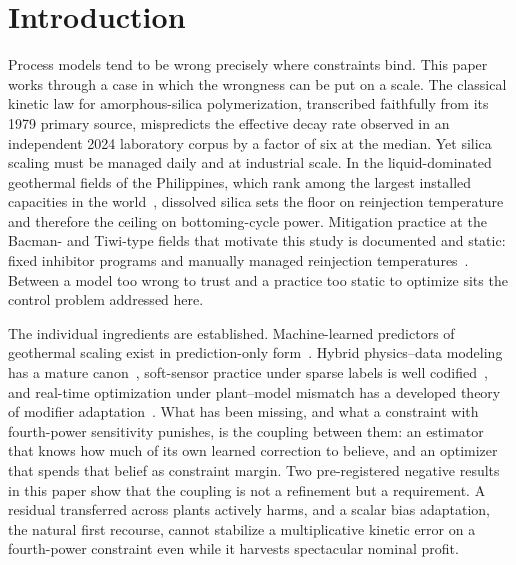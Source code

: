 \documentclass[review,number,sort&compress]{elsarticle}
\begin{document}
\section{Introduction}\label{sec:intro}

Process models tend to be wrong precisely where constraints bind. This
paper works through a case in which the wrongness can be put on a
scale. The classical kinetic law for amorphous-silica polymerization,
transcribed faithfully from its 1979 primary source, mispredicts the
effective decay rate observed in an independent 2024 laboratory corpus
by a factor of six at the median. Yet silica scaling must be managed
daily and at industrial scale. In the liquid-dominated geothermal
fields of the Philippines, which rank among the largest installed
capacities in the world~\citep{fronda2020country}, dissolved silica
sets the floor on reinjection temperature and therefore the ceiling on
bottoming-cycle power. Mitigation practice at the Bacman- and
Tiwi-type fields that motivate this study is documented and static:
fixed inhibitor programs and manually managed reinjection
temperatures~\citep{see2010wgc,remoroza2008ph,baltazar2014grc,%
kobayashi2024mahanagdong}. Between a model too wrong to trust and a
practice too static to optimize sits the control problem addressed
here.

The individual ingredients are established. Machine-learned predictors
of geothermal scaling exist in prediction-only
form~\citep{juhri2024sgw}. Hybrid physics--data modeling has a mature
canon~\citep{psichogios1992hybrid,thompson1994modeling,%
vonstosch2014hybrid,karniadakis2021physics}, soft-sensor practice under
sparse labels is well codified~\citep{kadlec2009data}, and real-time
optimization under plant--model mismatch has a developed theory of
modifier adaptation~\citep{marchetti2009modifier,marchetti2010dual,%
darby2011rto}. What has been missing, and what a constraint with
fourth-power sensitivity punishes, is the coupling between them: an
estimator that knows how much of its own learned correction to believe,
and an optimizer that spends that belief as constraint margin. Two
pre-registered negative results in this paper show that the coupling is
not a refinement but a requirement. A residual transferred across
plants actively harms, and a scalar bias adaptation, the natural first
recourse, cannot stabilize a multiplicative kinetic error on a
fourth-power constraint even while it harvests spectacular nominal
profit.
\end{document}
